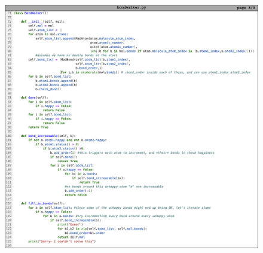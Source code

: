 \begin{figure}
    \centering
    \includegraphics[width=1\linewidth]{src/figures/FF_figs/bw3.png}
    \label{fig:bw3}
\end{figure}

